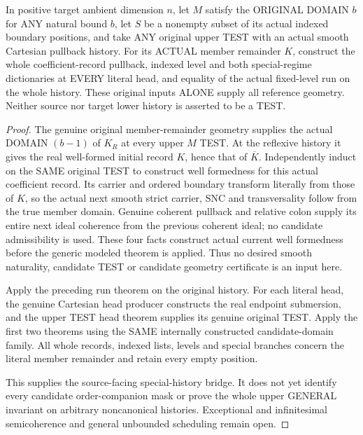 \begin{theorem}
\label{hir:original-member-untested-special-smooth-all-heads}
\leanok
In positive target ambient dimension $n$, let $M$ satisfy the ORIGINAL
DOMAIN $b$ for ANY natural bound $b$, let $S$ be a nonempty
subset of its actual indexed boundary positions, and take ANY original
upper TEST with an actual smooth Cartesian pullback history. For its
ACTUAL member remainder $K$, construct the whole coefficient-record
pullback, indexed level and both special-regime dictionaries at EVERY
literal head, and equality of the actual fixed-level run on the whole
history. These original inputs ALONE supply all reference geometry.
Neither source nor target lower history is asserted to be a TEST.
\end{theorem}
\begin{proof}
The genuine original member-remainder geometry supplies the actual
DOMAIN $(b-1)$ of $K_R$ at every upper $M$ TEST. At the reflexive
history it gives the real well-formed initial record $K$, hence that of
$\overline K$. Independently induct on the SAME original TEST to construct
well formedness for this actual coefficient record. Its carrier and
ordered boundary transform literally from those of $K$, so the actual
next smooth strict carrier, SNC and transversality follow from the true
member domain. Genuine coherent pullback and relative colon supply its
entire next ideal coherence from the previous coherent ideal; no
candidate admissibility is used. These four facts construct actual
current well formedness before the generic modeled theorem is applied.
Thus no desired smooth naturality,
candidate TEST or candidate geometry certificate is an input here.

Apply the preceding run theorem on the original history. For each
literal head, the genuine Cartesian head producer constructs the real
endpoint submersion, and the upper TEST head theorem supplies its genuine
original TEST. Apply the first two theorems using the SAME internally
constructed candidate-domain family. All whole records, indexed lists,
levels and special branches concern the literal member remainder and
retain every empty position.

This supplies the source-facing special-history bridge. It does not yet
identify every candidate order-companion mask or prove the whole upper
GENERAL invariant on arbitrary noncanonical histories. Exceptional and
infinitesimal semicoherence and general unbounded scheduling remain open.
\end{proof}
